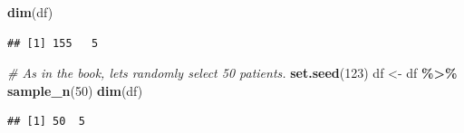 \documentclass[
]{book}
\newenvironment{Shaded}{\begin{snugshade}}{\end{snugshade}}
\newcommand{\CommentTok}[1]{\textcolor[rgb]{0.56,0.35,0.01}{\textit{#1}}}
\newcommand{\DecValTok}[1]{\textcolor[rgb]{0.00,0.00,0.81}{#1}}
\newcommand{\FunctionTok}[1]{\textcolor[rgb]{0.13,0.29,0.53}{\textbf{#1}}}
\newcommand{\NormalTok}[1]{#1}
\newcommand{\OtherTok}[1]{\textcolor[rgb]{0.56,0.35,0.01}{#1}}
\newcommand{\SpecialCharTok}[1]{\textcolor[rgb]{0.81,0.36,0.00}{\textbf{#1}}}
\begin{document}
\begin{Shaded}
\begin{Highlighting}[]
\FunctionTok{dim}\NormalTok{(df)}
\end{Highlighting}
\end{Shaded}

\begin{verbatim}
## [1] 155   5
\end{verbatim}

\begin{Shaded}
\begin{Highlighting}[]
\CommentTok{\# As in the book, let\textquotesingle{}s randomly select 50 patients.}
\FunctionTok{set.seed}\NormalTok{(}\DecValTok{123}\NormalTok{)}
\NormalTok{df }\OtherTok{\textless{}{-}}\NormalTok{ df }\SpecialCharTok{\%\textgreater{}\%} \FunctionTok{sample\_n}\NormalTok{(}\DecValTok{50}\NormalTok{)}
\FunctionTok{dim}\NormalTok{(df)}
\end{Highlighting}
\end{Shaded}

\begin{verbatim}
## [1] 50  5
\end{verbatim}
\end{document}
